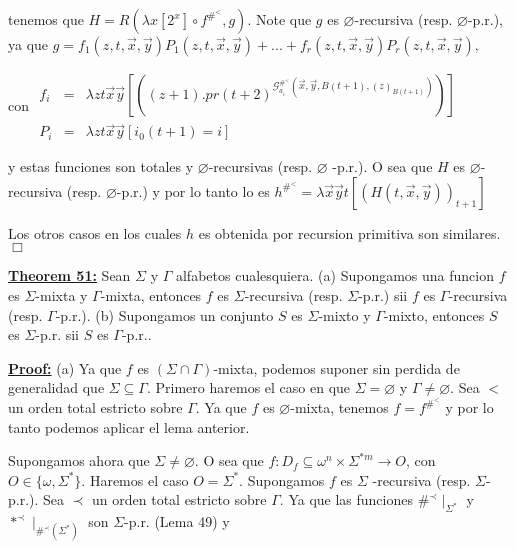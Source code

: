 tenemos que \(H=R(\lambda x\left[ 2^{x}\right] \circ f^{\#^{< }},g)\). Note que \(g\) es \(\varnothing \)-recursiva (resp. \(\varnothing \)-p.r.), ya que
\(\displaystyle g=f_{1}(z,t,\vec{x},\vec{y})P_{1}(z,t,\vec{x},\vec{y})+...+f_{r}(z,t,\vec{x}, \vec{y})P_{r}(z,t,\vec{x},\vec{y})\text{,} \)

con
\(\displaystyle \begin{array}{rcl} f_{i} & =& \lambda zt\vec{x}\vec{y}\left[ \left( (z+1).pr(t+2)^{\mathcal{G} _{a_{i}}^{\#^{< }}(\vec{x},\vec{y},B(t+1),(z)_{B(t+1)})}\right) \right] \\ P_{i} & =& \lambda zt\vec{x}\vec{y}\left[ i_{0}(t+1)=i\right] \end{array} \)

y estas funciones son totales y \(\varnothing \)-recursivas (resp. \(\varnothing \) -p.r.). O sea que \(H\) es \(\varnothing \)-recursiva (resp. \(\varnothing \)-p.r.) y por lo tanto lo es
\(\displaystyle h^{\#^{< }}=\lambda \vec{x}\vec{y}t\left[ (H(t,\vec{x},\vec{y}))_{t+1}\right] \)

Los otros casos en los cuales \(h\) es obtenida por recursion primitiva son similares. \(\Box\)


\textbf{\underline{Theorem 51:}} Sean \(\Sigma \) y \(\Gamma \) alfabetos cualesquiera.
(a) Supongamos una funcion \(f\) es \(\Sigma \)-mixta y \(\Gamma \)-mixta, entonces \(f\) es \(\Sigma \)-recursiva (resp. \(\Sigma \)-p.r.) sii \(f\) es \( \Gamma \)-recursiva (resp. \(\Gamma \)-p.r.).
(b) Supongamos un conjunto \(S\) es \(\Sigma \)-mixto y \(\Gamma \)-mixto, entonces \(S\) es \(\Sigma \)-p.r. sii \(S\) es \(\Gamma \)-p.r..


\textbf{\underline{Proof:}} (a) Ya que \(f\) es \((\Sigma \cap \Gamma )\)-mixta, podemos suponer sin perdida de generalidad que \(\Sigma \subseteq \Gamma \). Primero haremos el caso en que \(\Sigma =\varnothing \) y \(\Gamma \neq \varnothing \). Sea \(< \) un orden total estricto sobre \(\Gamma \). Ya que \(f\) es \(\varnothing \)-mixta, tenemos \( f=f^{\#^{< }}\) y por lo tanto podemos aplicar el lema anterior.

Supongamos ahora que \(\Sigma \neq \varnothing \). O sea que \(f:D_{f}\subseteq \omega ^{n}\times \Sigma ^{\ast m}\rightarrow O\), con \(O\in \{\omega ,\Sigma ^{\ast }\}.\) Haremos el caso \(O=\Sigma ^{\ast }.\) Supongamos \(f\) es \(\Sigma \) -recursiva (resp. \(\Sigma \)-p.r.). Sea \(\prec \) un orden total estricto sobre \(\Gamma .\) Ya que las funciones \(\#^{\prec }\mid _{\Sigma ^{\ast }}\) y \(\ast ^{\prec }\mid _{\#^{\prec }(\Sigma ^{\ast })}\) son \(\Sigma \)-p.r. (Lema 49) y

